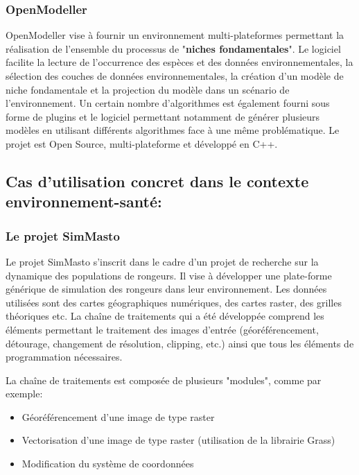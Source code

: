 \subsubsection{OpenModeller}

OpenModeller vise à fournir un environnement multi-plateformes permettant la réalisation de l'ensemble  du processus de "\textbf{niches fondamentales}". 
Le logiciel  facilite la lecture de l'occurrence des espèces et des données environnementales, la sélection des couches de données environnementales, la création d'un modèle de niche fondamentale et la projection du modèle dans un scénario de l'environnement. Un certain nombre d'algorithmes est également fourni sous forme de plugins et le logiciel permettant notamment de générer plusieurs modèles en utilisant différents
algorithmes face à une même problématique. Le projet est Open Source, multi-plateforme et développé en C++.


\subsection{Cas d'utilisation concret dans le contexte environnement-santé:}

\subsubsection{Le projet SimMasto}

Le projet SimMasto s'inscrit dans le cadre d'un projet de recherche sur la dynamique des populations de rongeurs. Il vise à développer une plate-forme générique de simulation des rongeurs dans leur environnement. Les données utilisées sont des cartes géographiques numériques, des cartes raster, des grilles théoriques etc.
La chaîne de traitements qui a été développée comprend les éléments permettant le traitement des images d'entrée (géoréférencement, détourage, changement de résolution, clipping, etc.) ainsi que tous les éléments de programmation nécessaires.

La chaîne de traitements est composée de plusieurs "modules", comme par exemple:
\begin{itemize}
\item Géoréférencement d'une image de type raster
\item Vectorisation d'une image de type raster (utilisation de la librairie Grass)
\item Modification du système de coordonnées
\end{itemize}

